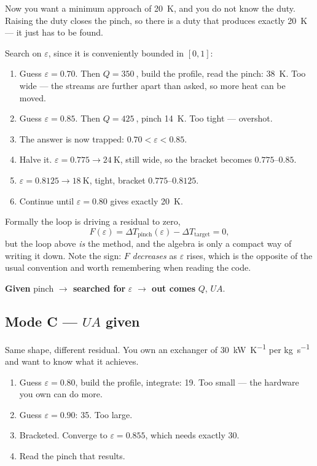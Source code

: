 \documentclass[11pt,a4paper]{report}
\begin{document}
Now you want a minimum approach of \SI{20}{\kelvin}, and you do not know the
duty. Raising the duty closes the pinch, so there is a duty that produces
exactly \SI{20}{\kelvin} --- it just has to be found.

Search on $\varepsilon$, since it is conveniently bounded in $[0,1]$:

\begin{enumerate}\itemsep2pt
\item Guess $\varepsilon = 0.70$. Then $Q = \SI{350}{}$, build the profile,
      read the pinch: \SI{38}{\kelvin}. Too wide --- the streams are further
      apart than asked, so more heat can be moved.
\item Guess $\varepsilon = 0.85$. Then $Q = \SI{425}{}$, pinch
      \SI{14}{\kelvin}. Too tight --- overshot.
\item The answer is now trapped: $0.70 < \varepsilon < 0.85$.
\item Halve it. $\varepsilon = 0.775 \to \SI{24}{\kelvin}$, still wide, so
      the bracket becomes $0.775$--$0.85$.
\item $\varepsilon = 0.8125 \to \SI{18}{\kelvin}$, tight, bracket
      $0.775$--$0.8125$.
\item Continue until $\varepsilon = 0.80$ gives exactly
      \SI{20}{\kelvin}.
\end{enumerate}

Formally the loop is driving a residual to zero,
\[
  F(\varepsilon) = \Delta T_{\mathrm{pinch}}(\varepsilon)
                   - \Delta T_{\mathrm{target}} = 0,
\]
but the loop above \emph{is} the method, and the algebra is only a compact
way of writing it down. Note the sign: $F$ \emph{decreases} as $\varepsilon$
rises, which is the opposite of the usual convention and worth remembering
when reading the code.

\noindent \textbf{Given} pinch \quad\textbf{$\to$ searched for}
$\varepsilon$ \quad\textbf{$\to$ out comes} $Q$, $UA$.

\subsection{Mode C --- $UA$ given}

Same shape, different residual. You own an exchanger of
\SI{30}{\kilo\watt\per\kelvin} per \si{\kilogram\per\second} and want to
know what it achieves.

\begin{enumerate}\itemsep2pt
\item Guess $\varepsilon = 0.80$, build the profile, integrate:
      \SI{19}{}. Too small --- the hardware you own can do more.
\item Guess $\varepsilon = 0.90$: \SI{35}{}. Too large.
\item Bracketed. Converge to $\varepsilon = 0.855$, which needs exactly
      \SI{30}{}.
\item Read the pinch that results.
\end{enumerate}
\end{document}
